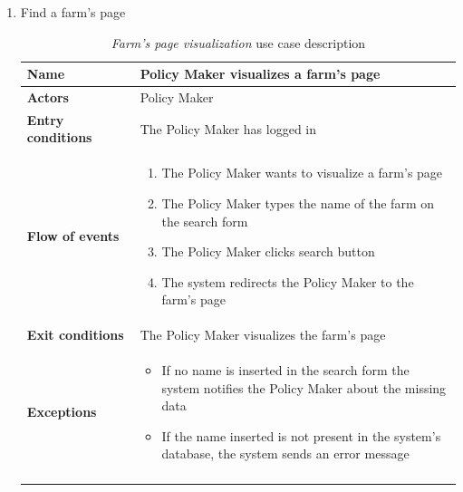 \begin{enumerate}
    \item Find a farm's page
    \begin{longtable}{p{0.26\linewidth}p{0.75\linewidth}}
        \toprule
        \textbf{Name} & \textbf{Policy Maker visualizes a farm’s page} \\
        \midrule
        \textbf{Actors} & Policy Maker \\
        \midrule
        \textbf{Entry conditions} & The Policy Maker has logged in\\
        \midrule
        \textbf{Flow of events} & 
        \begin{enumerate}
            \item The Policy Maker wants to visualize a farm's page
            \item The Policy Maker types the name of the farm on the search form
            \item The Policy Maker clicks search button
            \item The system redirects the Policy Maker to the farm's page
        \end{enumerate} \\
        \midrule
        \textbf{Exit conditions} & The Policy Maker visualizes the farm's page\\
        \midrule
        \textbf{Exceptions} & 
        \begin{itemize}
            \item If no name is inserted in the search form the system notifies the Policy Maker about the missing data
            \item If the name inserted is not present in the system's database, the system sends an error message
        \end{itemize}\\
        \bottomrule
        \caption{\emph{Farm’s page visualization} use case description}
    \end{longtable}
    \begin{figure}[H]
        \begin{center}

\end{center}
\end{figure}
\end{enumerate}
